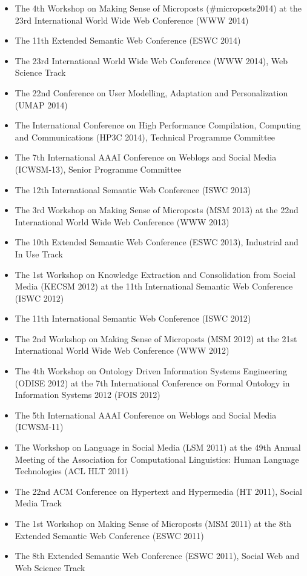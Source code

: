 \documentclass[10pt,a4paper]{res} %
\begin{document}
\begin{resume}
\begin{itemize}
\item The 4th Workshop on Making Sense of Microposts (\#microposts2014) at the 23rd International World Wide Web Conference (WWW 2014)
\item The 11th Extended Semantic Web Conference (ESWC 2014)
\item The 23rd International World Wide Web Conference (WWW 2014), Web Science Track
\item The 22nd Conference on User Modelling, Adaptation and Personalization (UMAP 2014)
\item The International Conference on High Performance Compilation, Computing and Communications (HP3C 2014), Technical Programme Committee
\item The 7th International AAAI Conference on Weblogs and Social Media (ICWSM-13), Senior Programme Committee
\item The 12th International Semantic Web Conference (ISWC 2013)
\item The 3rd Workshop on Making Sense of Microposts (MSM 2013) at the 22nd International World Wide Web Conference (WWW 2013)
\item The 10th Extended Semantic Web Conference (ESWC 2013), Industrial and In Use Track
\item The 1st Workshop on Knowledge Extraction and Consolidation from Social Media (KECSM 2012) at the 11th International Semantic Web Conference (ISWC 2012)
\item The 11th International Semantic Web Conference (ISWC 2012)
\item The 2nd Workshop on Making Sense of Microposts (MSM 2012) at the 21st International World Wide Web Conference (WWW 2012)
\item The 4th Workshop on Ontology Driven Information Systems Engineering (ODISE 2012) at the 7th International Conference on Formal Ontology in Information Systems 2012 (FOIS 2012)
\item The 5th International AAAI Conference on Weblogs and Social Media (ICWSM-11)
\item The Workshop on Language in Social Media (LSM 2011) at the 49th Annual Meeting of the Association for Computational Linguistics: Human Language Technologies (ACL HLT 2011)
\item The 22nd ACM Conference on Hypertext and Hypermedia (HT 2011), Social Media Track
\item The 1st Workshop on Making Sense of Microposts (MSM 2011) at the 8th Extended Semantic Web Conference (ESWC 2011)
\item The 8th Extended Semantic Web Conference (ESWC 2011), Social Web and Web Science Track

\end{itemize}
\end{resume}
\end{document}

